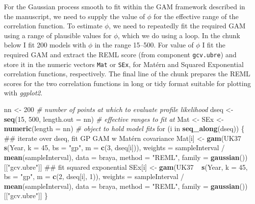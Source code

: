 \documentclass[12pt,]{article}
\newenvironment{Shaded}{\begin{snugshade}}{\end{snugshade}}
\newcommand{\KeywordTok}[1]{\textcolor[rgb]{0.13,0.29,0.53}{\textbf{{#1}}}}
\newcommand{\DataTypeTok}[1]{\textcolor[rgb]{0.13,0.29,0.53}{{#1}}}
\newcommand{\DecValTok}[1]{\textcolor[rgb]{0.00,0.00,0.81}{{#1}}}
\newcommand{\StringTok}[1]{\textcolor[rgb]{0.31,0.60,0.02}{{#1}}}
\newcommand{\CommentTok}[1]{\textcolor[rgb]{0.56,0.35,0.01}{\textit{{#1}}}}
\newcommand{\NormalTok}[1]{{#1}}
\begin{document}
For the Gaussian process smooth to fit within the GAM framework
described in the manuscript, we need to supply the value of \(\phi\) for
the effective range of the correlation function. To estimate \(\phi\),
we need to repeatedly fit the required GAM using a range of plausible
values for \(\phi\), which we do using a loop. In the chunk below I fit
200 models with \(\phi\) in the range 15--500. For value of \(\phi\) I
fit the required GAM and extract the REML score (from component
\texttt{gcv.ubre}) and store it in the numeric vectors \texttt{Mat} or
\texttt{SEx}, for Matérn and Squared Exponential correlation functions,
respectively. The final line of the chunk prepares the REML scores for
the two correlation functions in long or tidy format suitable for
plotting with \emph{ggplot2}.

\begin{Shaded}
\begin{Highlighting}[]
\NormalTok{nn <-}\StringTok{ }\DecValTok{200}    \CommentTok{# number of points at which to evaluate profile likelihood}
\NormalTok{dseq <-}\StringTok{ }\KeywordTok{seq}\NormalTok{(}\DecValTok{15}\NormalTok{, }\DecValTok{500}\NormalTok{, }\DataTypeTok{length.out =} \NormalTok{nn)  }\CommentTok{# effective ranges to fit at}
\NormalTok{Mat <-}\StringTok{ }\NormalTok{SEx <-}\StringTok{ }\KeywordTok{numeric}\NormalTok{(}\DataTypeTok{length =} \NormalTok{nn)     }\CommentTok{# object to hold model fits}
\NormalTok{for (i in }\KeywordTok{seq_along}\NormalTok{(dseq)) \{ }
    \NormalTok{## iterate over dseq, fit GP GAM w Matérn covariance}
    \NormalTok{Mat[i] <-}\StringTok{ }\KeywordTok{gam}\NormalTok{(UK37 ~}\StringTok{ }\KeywordTok{s}\NormalTok{(Year, }\DataTypeTok{k =} \DecValTok{45}\NormalTok{, }\DataTypeTok{bs =} \StringTok{"gp"}\NormalTok{, }\DataTypeTok{m =} \KeywordTok{c}\NormalTok{(}\DecValTok{3}\NormalTok{, dseq[i])),}
                  \DataTypeTok{weights =} \NormalTok{sampleInterval /}\StringTok{ }\KeywordTok{mean}\NormalTok{(sampleInterval),}
                  \DataTypeTok{data =} \NormalTok{braya, }\DataTypeTok{method =} \StringTok{"REML"}\NormalTok{,}
                  \DataTypeTok{family =} \KeywordTok{gaussian}\NormalTok{())[[}\StringTok{"gcv.ubre"}\NormalTok{]]}
    \NormalTok{## fit squared exponential}
    \NormalTok{SEx[i] <-}\StringTok{ }\KeywordTok{gam}\NormalTok{(UK37 ~}\StringTok{ }\KeywordTok{s}\NormalTok{(Year, }\DataTypeTok{k =} \DecValTok{45}\NormalTok{, }\DataTypeTok{bs =} \StringTok{"gp"}\NormalTok{, }\DataTypeTok{m =} \KeywordTok{c}\NormalTok{(}\DecValTok{2}\NormalTok{, dseq[i], }\DecValTok{1}\NormalTok{)),}
                  \DataTypeTok{weights =} \NormalTok{sampleInterval /}\StringTok{ }\KeywordTok{mean}\NormalTok{(sampleInterval),}
                  \DataTypeTok{data =} \NormalTok{braya, }\DataTypeTok{method =} \StringTok{"REML"}\NormalTok{,}
                  \DataTypeTok{family =} \KeywordTok{gaussian}\NormalTok{())[[}\StringTok{"gcv.ubre"}\NormalTok{]]}
\NormalTok{\}}


\end{Highlighting}
\end{Shaded}
\end{document}
